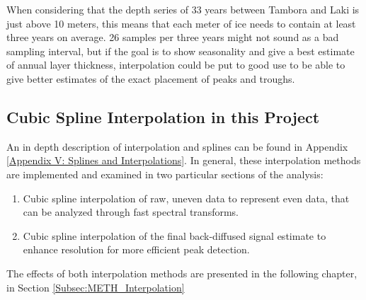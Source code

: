 \documentclass[../../CompleteThesis2/Complete_2ndDraft]{subfiles}
\begin{document}
When considering that the depth series of 33 years between Tambora and Laki is just above 10 meters, this means that each meter of ice needs to contain at least three years on average. 26 samples per three years might not sound as a bad sampling interval, but if the goal is to show seasonality and give a best estimate of annual layer thickness, interpolation could be put to good use to be able to give better estimates of the exact placement of peaks and troughs.





\subsection[Interpolation in this Project][Interpolation in this Project]{Cubic Spline Interpolation in this Project}
\label{Subsec:CompMeths_SplinesAndInterpolation_InterpolationInThisProj}
An in depth description of interpolation and splines can be found in Appendix \ref{Appendix V: Splines and Interpolations}. In general, these interpolation methods are implemented and examined in two particular sections of the analysis: 
\begin{enumerate}
	\item Cubic spline interpolation of raw, uneven data to represent even data, that can be analyzed through fast spectral transforms.
	\item Cubic spline interpolation of the final back-diffused signal estimate to enhance resolution for more efficient peak detection.
\end{enumerate}

The effects of both interpolation methods are presented in the following chapter, in Section \ref{Subsec:METH_Interpolation}
\end{document}

